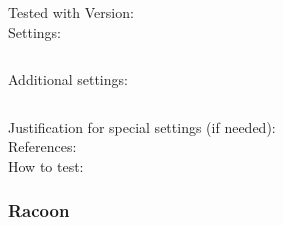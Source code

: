 \begin{description}
\item[Tested with Version:] 

\item[Settings:] \mbox{}

\begin{lstlisting}[breaklines]
    %Here goes your setting string
\end{lstlisting}

\item[Additional settings:] \mbox{}


\begin{lstlisting}[breaklines]
    %copy \& paste additional settings
\end{lstlisting}

\item[Justification for special settings (if needed):] \mbox{}


\item[References:] 


\item[How to test:]

\end{description}






\subsubsection{Racoon}


